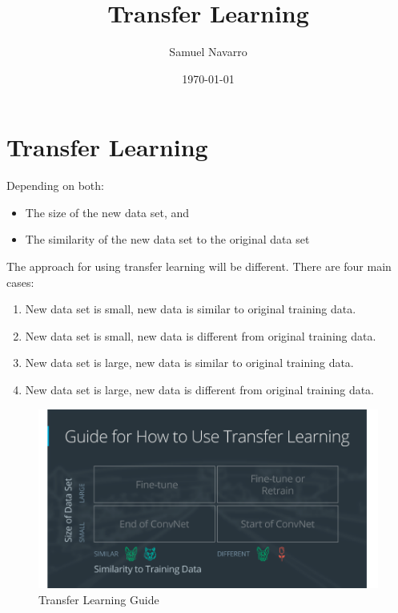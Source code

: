 \documentclass[11pt, a4paper]{article}
\begin{document}
\title{Transfer Learning}
\author{Samuel Navarro}
\date{\today}
\maketitle
\tableofcontents{}
	


\section{Transfer Learning}%
\label{sec:transfer_learning}

Depending on both:
\begin{itemize}
	\item The size of the new data set, and
	\item The similarity of the new data set to the original data set
\end{itemize}


The approach for using transfer learning will be different. There are four main cases:

\begin{enumerate}
	\item New data set is small, new data is similar to original training data.
	\item New data set is small, new data is different from original training data.
	\item New data set is large, new data is similar to original training data.
	\item New data set is large, new data is different from original training data.
\end{enumerate}



\begin{figure}[htpb!]
	\centering
	\includegraphics[width=0.8\linewidth]{transfer_learning_guide}
	\caption{Transfer Learning Guide}
	\label{fig:transfer_leraning_guide}
\end{figure}
\end{document}

